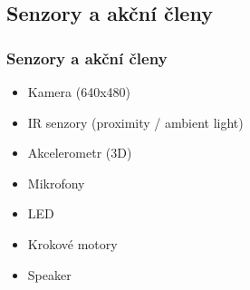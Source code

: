 \documentclass{beamer}
\begin{document}
\subsection{Senzory a akční členy}

\begin{frame}
    \frametitle{Senzory a akční členy}
    \begin{itemize}
        \item Kamera (640x480)
        \item IR senzory (proximity / ambient light)
        \item Akcelerometr (3D)
        \item Mikrofony
        \item LED
        \item Krokové motory
        \item Speaker
    \end{itemize}
\end{frame}
\end{document}
